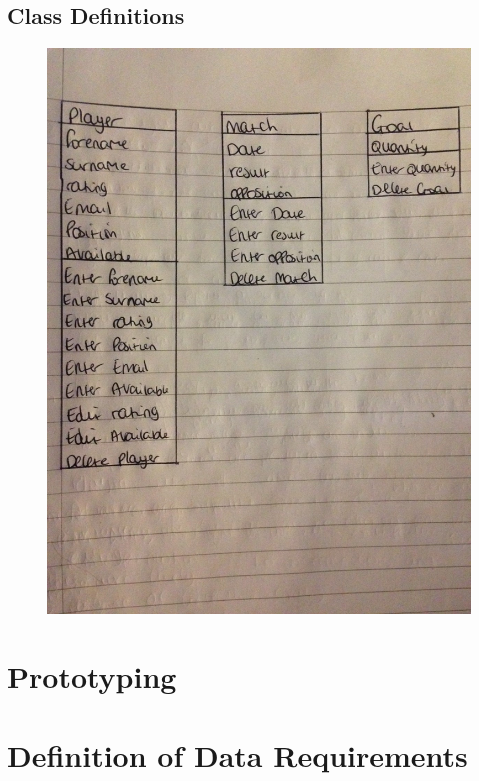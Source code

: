\subsection{Class Definitions}
\begin{figure}[H]
	\includegraphics[width=150mm]{classdef}
\end{figure}

\section{Prototyping}

\section{Definition of Data Requirements}

